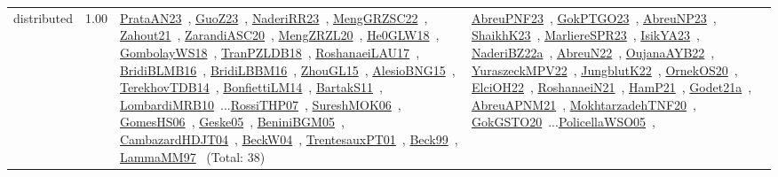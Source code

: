 {\begin{longtable}{p{3cm}r>{\raggedright\arraybackslash}p{6cm}>{\raggedright\arraybackslash}p{6cm}>{\raggedright\arraybackslash}p{8cm}}
\index{distributed}\index{Concepts!distributed}distributed &  1.00 & \href{../works/PrataAN23.pdf}{PrataAN23}~\cite{PrataAN23}, \href{../works/GuoZ23.pdf}{GuoZ23}~\cite{GuoZ23}, \href{../works/NaderiRR23.pdf}{NaderiRR23}~\cite{NaderiRR23}, \href{../works/MengGRZSC22.pdf}{MengGRZSC22}~\cite{MengGRZSC22}, \href{../works/Zahout21.pdf}{Zahout21}~\cite{Zahout21}, \href{../works/ZarandiASC20.pdf}{ZarandiASC20}~\cite{ZarandiASC20}, \href{../works/MengZRZL20.pdf}{MengZRZL20}~\cite{MengZRZL20}, \href{../works/He0GLW18.pdf}{He0GLW18}~\cite{He0GLW18}, \href{../works/GombolayWS18.pdf}{GombolayWS18}~\cite{GombolayWS18}, \href{../works/TranPZLDB18.pdf}{TranPZLDB18}~\cite{TranPZLDB18}, \href{../works/RoshanaeiLAU17.pdf}{RoshanaeiLAU17}~\cite{RoshanaeiLAU17}, \href{../works/BridiBLMB16.pdf}{BridiBLMB16}~\cite{BridiBLMB16}, \href{../works/BridiLBBM16.pdf}{BridiLBBM16}~\cite{BridiLBBM16}, \href{../works/ZhouGL15.pdf}{ZhouGL15}~\cite{ZhouGL15}, \href{../works/AlesioBNG15.pdf}{AlesioBNG15}~\cite{AlesioBNG15}, \href{../works/TerekhovTDB14.pdf}{TerekhovTDB14}~\cite{TerekhovTDB14}, \href{../works/BonfiettiLM14.pdf}{BonfiettiLM14}~\cite{BonfiettiLM14}, \href{../works/BartakS11.pdf}{BartakS11}~\cite{BartakS11}, \href{../works/LombardiMRB10.pdf}{LombardiMRB10}~\cite{LombardiMRB10}...\href{../works/RossiTHP07.pdf}{RossiTHP07}~\cite{RossiTHP07}, \href{../works/SureshMOK06.pdf}{SureshMOK06}~\cite{SureshMOK06}, \href{../works/GomesHS06.pdf}{GomesHS06}~\cite{GomesHS06}, \href{../works/Geske05.pdf}{Geske05}~\cite{Geske05}, \href{../works/BeniniBGM05.pdf}{BeniniBGM05}~\cite{BeniniBGM05}, \href{../works/CambazardHDJT04.pdf}{CambazardHDJT04}~\cite{CambazardHDJT04}, \href{../works/BeckW04.pdf}{BeckW04}~\cite{BeckW04}, \href{../works/TrentesauxPT01.pdf}{TrentesauxPT01}~\cite{TrentesauxPT01}, \href{../works/Beck99.pdf}{Beck99}~\cite{Beck99}, \href{../works/LammaMM97.pdf}{LammaMM97}~\cite{LammaMM97} (Total: 38) & \href{../works/AbreuPNF23.pdf}{AbreuPNF23}~\cite{AbreuPNF23}, \href{../works/GokPTGO23.pdf}{GokPTGO23}~\cite{GokPTGO23}, \href{../works/AbreuNP23.pdf}{AbreuNP23}~\cite{AbreuNP23}, \href{../works/ShaikhK23.pdf}{ShaikhK23}~\cite{ShaikhK23}, \href{../works/MarliereSPR23.pdf}{MarliereSPR23}~\cite{MarliereSPR23}, \href{../works/IsikYA23.pdf}{IsikYA23}~\cite{IsikYA23}, \href{../works/NaderiBZ22a.pdf}{NaderiBZ22a}~\cite{NaderiBZ22a}, \href{../works/AbreuN22.pdf}{AbreuN22}~\cite{AbreuN22}, \href{../works/OujanaAYB22.pdf}{OujanaAYB22}~\cite{OujanaAYB22}, \href{../works/YuraszeckMPV22.pdf}{YuraszeckMPV22}~\cite{YuraszeckMPV22}, \href{../works/JungblutK22.pdf}{JungblutK22}~\cite{JungblutK22}, \href{../works/OrnekOS20.pdf}{OrnekOS20}~\cite{OrnekOS20}, \href{../works/ElciOH22.pdf}{ElciOH22}~\cite{ElciOH22}, \href{../works/RoshanaeiN21.pdf}{RoshanaeiN21}~\cite{RoshanaeiN21}, \href{../works/HamP21.pdf}{HamP21}~\cite{HamP21}, \href{../works/Godet21a.pdf}{Godet21a}~\cite{Godet21a}, \href{../works/AbreuAPNM21.pdf}{AbreuAPNM21}~\cite{AbreuAPNM21}, \href{../works/MokhtarzadehTNF20.pdf}{MokhtarzadehTNF20}~\cite{MokhtarzadehTNF20}, \href{../works/GokGSTO20.pdf}{GokGSTO20}~\cite{GokGSTO20}...\href{../works/PolicellaWSO05.pdf}{PolicellaWSO05}~\cite{PolicellaWSO05}, 
\end{longtable}}
